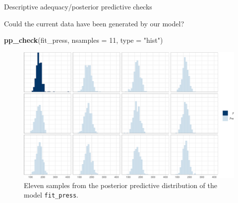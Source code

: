 \documentclass[12pt,ignorenonframetext,aspectratio=169]{beamer}
\newenvironment{Shaded}{\begin{snugshade}}{\end{snugshade}}
\newcommand{\DataTypeTok}[1]{\textcolor[rgb]{0.13,0.29,0.53}{#1}}
\newcommand{\DecValTok}[1]{\textcolor[rgb]{0.00,0.00,0.81}{#1}}
\newcommand{\KeywordTok}[1]{\textcolor[rgb]{0.13,0.29,0.53}{\textbf{#1}}}
\newcommand{\NormalTok}[1]{#1}
\newcommand{\StringTok}[1]{\textcolor[rgb]{0.31,0.60,0.02}{#1}}
\begin{document}
\begin{frame}{Descriptive adequacy/posterior predictive checks}
\protect\hypertarget{descriptive-adequacyposterior-predictive-checks}{}

\begin{block}{Could the current data have been generated by our model?}

\end{block}

\end{frame}

\begin{frame}[fragile]



\small

\begin{Shaded}
\begin{Highlighting}[]
\KeywordTok{pp_check}\NormalTok{(fit_press, }\DataTypeTok{nsamples =} \DecValTok{11}\NormalTok{, }\DataTypeTok{type =} \StringTok{"hist"}\NormalTok{)}
\end{Highlighting}
\end{Shaded}

\begin{figure}
\centering
\includegraphics{03-compbayes-slides_files/figure-beamer/normalppc-1.pdf}
\caption{\label{fig:normalppc}Eleven samples from the posterior predictive distribution of the model \texttt{fit\_press}.}
\end{figure}

\normalsize

\end{frame}
\end{document}
